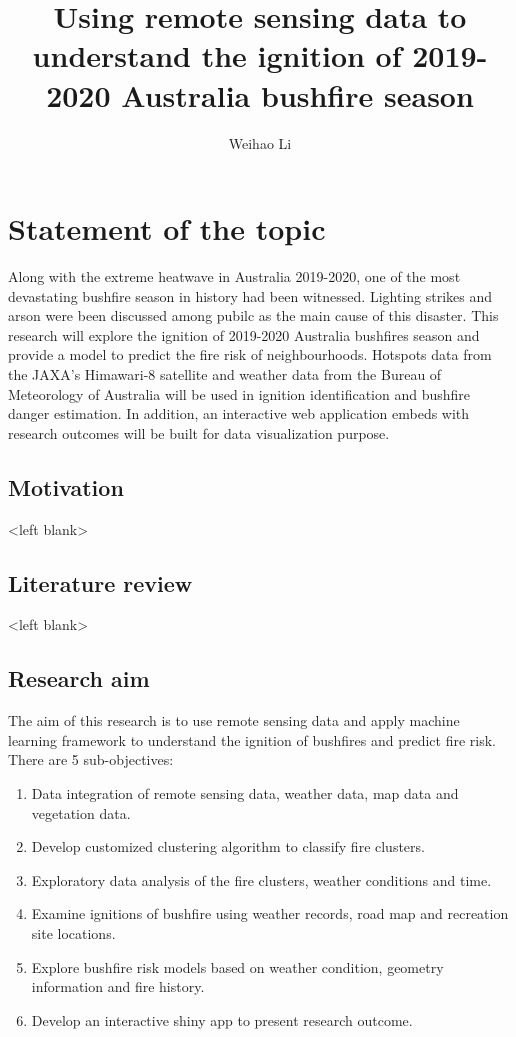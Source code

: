\documentclass{monashthesis}
\author{Weihao Li}
\title{Using remote sensing data to understand the ignition of 2019-2020
Australia bushfire season}
\begin{document}

\titlepage

{\sf\tighttoc\doublespacing}

\clearpage{}\setcounter{page}{0}

\chapter{Statement of the topic}\label{ch:intro}

Along with the extreme heatwave in Australia 2019-2020, one of the most
devastating bushfire season in history had been witnessed. Lighting
strikes and arson were been discussed among pubilc as the main cause of
this disaster. This research will explore the ignition of 2019-2020
Australia bushfires season and provide a model to predict the fire risk
of neighbourhoods. Hotspots data from the JAXA's Himawari-8 satellite
and weather data from the Bureau of Meteorology of Australia will be
used in ignition identification and bushfire danger estimation. In
addition, an interactive web application embeds with research outcomes
will be built for data visualization purpose.

\section{Motivation}\label{motivation}

\textless{}left blank\textgreater{}

\section{Literature review}\label{literature-review}

\textless{}left blank\textgreater{}

\section{Research aim}\label{research-aim}

The aim of this research is to use remote sensing data and apply machine
learning framework to understand the ignition of bushfires and predict
fire risk. There are 5 sub-objectives:

\begin{enumerate}
\def\labelenumi{\arabic{enumi}.}
\tightlist
\item
  Data integration of remote sensing data, weather data, map data and
  vegetation data.
\item
  Develop customized clustering algorithm to classify fire clusters.
\item
  Exploratory data analysis of the fire clusters, weather conditions and
  time.
\item
  Examine ignitions of bushfire using weather records, road map and
  recreation site locations.
\item
  Explore bushfire risk models based on weather condition, geometry
  information and fire history.
\item
  Develop an interactive shiny app to present research outcome.
\end{enumerate}
\end{document}
